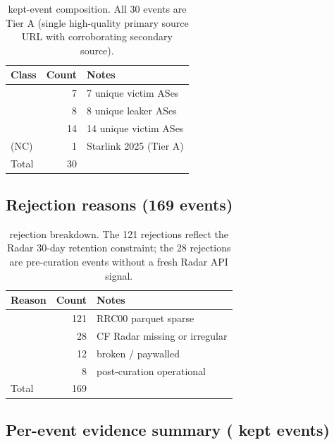 \documentclass[sigcomm,nonatbib]{acmart}
\begin{document}
\begin{table}[h]
\centering
\small
\setlength{\tabcolsep}{4pt}
\begin{tabular}{p{}rp{}}
\hline
Class & Count & Notes \\ \hline
 & 7 & 7 unique victim ASes \\
 & 8 & 8 unique leaker ASes \\
 & 14 & 14 unique victim ASes \\
 (NC) & 1 & Starlink 2025 (Tier A) \\
\hline
Total & 30 & \\
\hline
\end{tabular}

\caption{ kept-event composition. All 30 events are
Tier A (single high-quality primary source URL with
corroborating secondary source).}
\label{tab:s17-comp}
\end{table}

\subsection{Rejection reasons (169 events)}

\begin{table}[h]
\centering
\small
\setlength{\tabcolsep}{4pt}
\begin{tabular}{p{}rp{}}
\hline
Reason & Count & Notes \\ \hline
 & 121 & RRC00 parquet sparse \\
 & 28 & CF Radar missing or irregular \\
 & 12 & broken / paywalled \\
 & 8 & post-curation operational \\
\hline
Total & 169 & \\
\hline
\end{tabular}

\caption{ rejection breakdown. The 121 \protect
rejections reflect the \cf{} Radar 30-day retention
constraint; the 28 \protect rejections
are pre-curation events without a fresh Radar API signal.}
\label{tab:s17-rej}
\end{table}

\subsection{Per-event evidence summary ( kept events)}

\begin{table}[h]
\centering\tiny


\caption{All 30 events with their routing and
traffic evidence. ``RRC v\_o'' is the
\protect count; ``RRC a\_o'' is the
\protect count; ``traffic \%'' is
the peak traffic drop during the event window. The
Starlink event is the negative control; the North
Korea event has no cache due to a \cf{} Radar
HTTP~400.}
\label{tab:s17-per-event}
\end{table}
\end{document}
